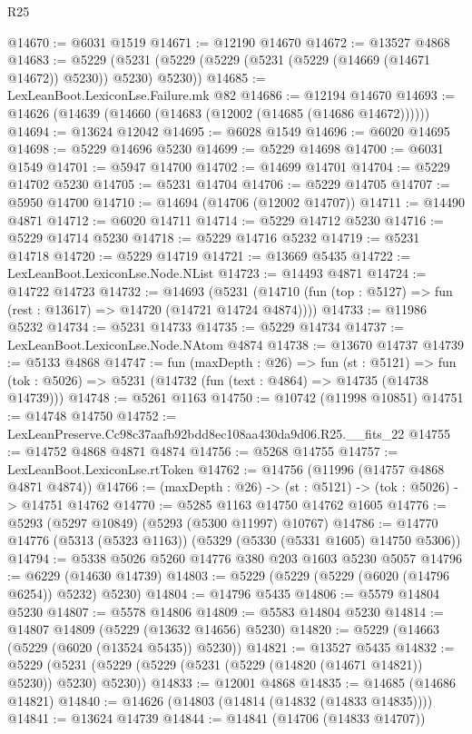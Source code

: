 \begin{lexlean}{R25}
\begin{coremodule}
@14670 := @6031 @1519
@14671 := @12190 @14670
@14672 := @13527 @4868
@14683 := @5229 (@5231 (@5229 (@5229 (@5231 (@5229 (@14669 (@14671 @14672)) @5230)) @5230) @5230))
@14685 := LexLeanBoot.LexiconLse.Failure.mk @82
@14686 := @12194 @14670
@14693 := @14626 (@14639 (@14660 (@14683 (@12002 (@14685 (@14686 @14672))))))
@14694 := @13624 @12042
@14695 := @6028 @1549
@14696 := @6020 @14695
@14698 := @5229 @14696 @5230
@14699 := @5229 @14698
@14700 := @6031 @1549
@14701 := @5947 @14700
@14702 := @14699 @14701
@14704 := @5229 @14702 @5230
@14705 := @5231 @14704
@14706 := @5229 @14705
@14707 := @5950 @14700
@14710 := @14694 (@14706 (@12002 @14707))
@14711 := @14490 @4871
@14712 := @6020 @14711
@14714 := @5229 @14712 @5230
@14716 := @5229 @14714 @5230
@14718 := @5229 @14716 @5232
@14719 := @5231 @14718
@14720 := @5229 @14719
@14721 := @13669 @5435
@14722 := LexLeanBoot.LexiconLse.Node.NList
@14723 := @14493 @4871
@14724 := @14722 @14723
@14732 := @14693
    (@5231 (@14710 (fun (top : @5127) => fun (rest : @13617) => @14720 (@14721 @14724 @4874))))
@14733 := @11986 @5232
@14734 := @5231 @14733
@14735 := @5229 @14734
@14737 := LexLeanBoot.LexiconLse.Node.NAtom @4874
@14738 := @13670 @14737
@14739 := @5133 @4868
@14747 := fun (maxDepth : @26) =>
  fun (st : @5121) =>
  fun (tok : @5026) => @5231 (@14732 (fun (text : @4864) => @14735 (@14738 @14739)))
@14748 := @5261 @1163
@14750 := @10742 (@11998 @10851)
@14751 := @14748 @14750
@14752 := LexLeanPreserve.Cc98c37aafb92bdd8ec108aa430da9d06.R25.__fits_22
@14755 := @14752 @4868 @4871 @4874
@14756 := @5268 @14755
@14757 := LexLeanBoot.LexiconLse.rtToken
@14762 := @14756 (@11996 (@14757 @4868 @4871 @4874))
@14766 := (maxDepth : @26) -> (st : @5121) -> (tok : @5026) -> @14751 @14762
@14770 := @5285 @1163 @14750 @14762 @1605
@14776 := @5293 (@5297 @10849) (@5293 (@5300 @11997) @10767)
@14786 := @14770 @14776 (@5313 (@5323 @1163)) (@5329 (@5330 (@5331 @1605) @14750 @5306))
@14794 := @5338 @5026 @5260 @14776 @380 @203 @1603 @5230 @5057
@14796 := @6229 (@14630 @14739)
@14803 := @5229 (@5229 (@5229 (@6020 (@14796 @6254)) @5232) @5230)
@14804 := @14796 @5435
@14806 := @5579 @14804 @5230
@14807 := @5578 @14806
@14809 := @5583 @14804 @5230
@14814 := @14807 @14809 (@5229 (@13632 @14656) @5230)
@14820 := @5229 (@14663 (@5229 (@6020 (@13524 @5435)) @5230))
@14821 := @13527 @5435
@14832 := @5229 (@5231 (@5229 (@5229 (@5231 (@5229 (@14820 (@14671 @14821)) @5230)) @5230) @5230))
@14833 := @12001 @4868
@14835 := @14685 (@14686 @14821)
@14840 := @14626 (@14803 (@14814 (@14832 (@14833 @14835))))
@14841 := @13624 @14739
@14844 := @14841 (@14706 (@14833 @14707))

\end{coremodule}
\end{lexlean}
